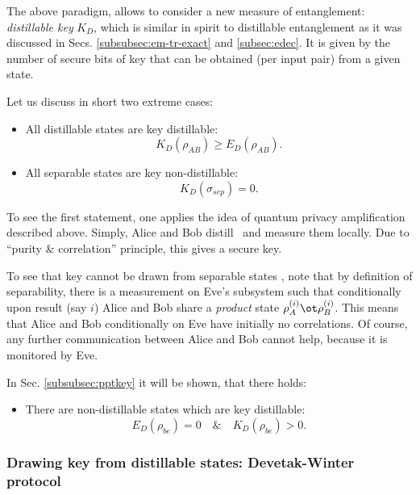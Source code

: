 \documentclass[rmp,12pt,preprint]{revtex4-2}
\begin{document}
The above paradigm, allows to consider a new measure of entanglement:
{\it distillable key} $K_D$, which is similar in spirit to distillable
entanglement as it was discussed in Secs. \ref{subsubsec:em-tr-exact}
and \ref{subsec:edec}. It is given by the number of secure bits of key
that can be obtained (per input pair) from a given state.

Let us discuss in short two extreme cases:
\begin{itemize}
\item All distillable states are key distillable:
  \begin{equation}
    K_D(\rho_{AB})\geq E_D(\rho_{AB}).
  \end{equation}
\item All separable states are key non-distillable:
  \begin{equation}
    K_D(\sigma_{sep})=0.
  \end{equation}
\end{itemize}

To see the first statement, one applies the idea of quantum privacy
amplification described above. Simply, Alice and Bob distill
\singlets\, and measure them locally. Due to ``purity \& correlation''
principle, this gives a secure key.

To see that key cannot be drawn from separable states
\cite{GisinWolf_linking,CurtyLewLut}, note that by definition of
separability, there is a measurement on Eve's subsystem such that
conditionally upon result (say $i$) Alice and Bob share a {\it
  product} state $\rho_A^{(i)}\ot \rho_B^{(i)}$. This means that Alice
and Bob conditionally on Eve have initially no correlations. Of
course, any further communication between Alice and Bob cannot help,
because it is monitored by Eve.

In Sec. \ref{subsubsec:pptkey} it will be shown, that there holds:
\begin{itemize}
\item There are non-distillable states which are key distillable:
  \begin{equation}
    E_D(\rho_{be})=0\quad\&\quad K_D(\rho_{be})>0.
  \end{equation}
\end{itemize}



\subsubsection{Drawing key from distillable states: Devetak-Winter protocol}
\label{subsubsec:cqq}
\end{document}
